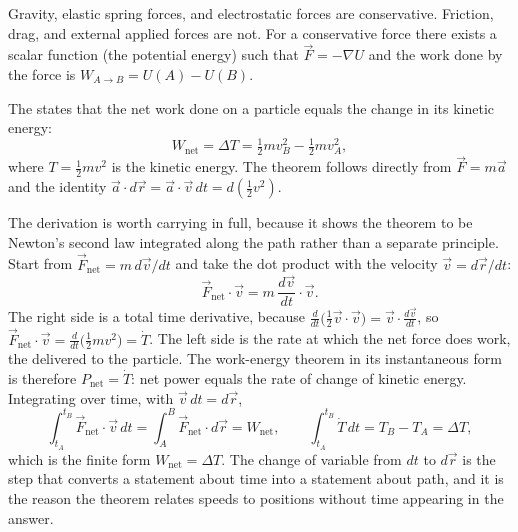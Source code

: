 Gravity, elastic spring forces, and electrostatic forces are
conservative. Friction, drag, and external applied forces are not.
For a conservative force there exists a scalar function (the
potential energy) such that $\vec{F} = -\nabla U$ and the work done
by the force is $W_{A \to B} = U(A) - U(B)$.

The  states that the net work done on a
particle equals the change in its kinetic energy:
\[
W_{\text{net}} = \Delta T = \tfrac{1}{2} m v_B^2 - \tfrac{1}{2} m v_A^2,
\]
where $T = \tfrac{1}{2} m v^2$ is the kinetic energy. The theorem
follows directly from $\vec{F} = m\vec{a}$ and the identity $\vec{a}
\cdot d\vec{r} = \vec{a} \cdot \vec{v} \,dt = d(\tfrac{1}{2} v^2)$.

The derivation is worth carrying in full, because it shows the theorem
to be Newton's second law integrated along the path rather than a
separate principle. Start from $\vec{F}_{\text{net}}=m\,d\vec{v}/dt$ and
take the dot product with the velocity $\vec{v}=d\vec{r}/dt$:
\[
\vec{F}_{\text{net}}\cdot\vec{v}=m\,\frac{d\vec{v}}{dt}\cdot\vec{v}.
\]
The right side is a total time derivative, because $\frac{d}{dt}\bigl(
\tfrac{1}{2}\vec{v}\cdot\vec{v}\bigr)=\vec{v}\cdot\frac{d\vec{v}}{dt}$, so
$\vec{F}_{\text{net}}\cdot\vec{v}=\frac{d}{dt}\bigl(\tfrac{1}{2}mv^{2}
\bigr)=\dot{T}$. The left side is the rate at which the net force does
work, the  delivered to the particle. The work-energy
theorem in its instantaneous form is therefore $P_{\text{net}}=\dot{T}$:
net power equals the rate of change of kinetic energy. Integrating over
time, with $\vec{v}\,dt=d\vec{r}$,
\[
\int_{t_{A}}^{t_{B}}\vec{F}_{\text{net}}\cdot\vec{v}\,dt
=\int_{A}^{B}\vec{F}_{\text{net}}\cdot d\vec{r}=W_{\text{net}},
\qquad
\int_{t_{A}}^{t_{B}}\dot{T}\,dt=T_{B}-T_{A}=\Delta T,
\]
which is the finite form $W_{\text{net}}=\Delta T$. The change of
variable from $dt$ to $d\vec{r}$ is the step that converts a statement
about time into a statement about path, and it is the reason the theorem
relates speeds to positions without time appearing in the answer.

